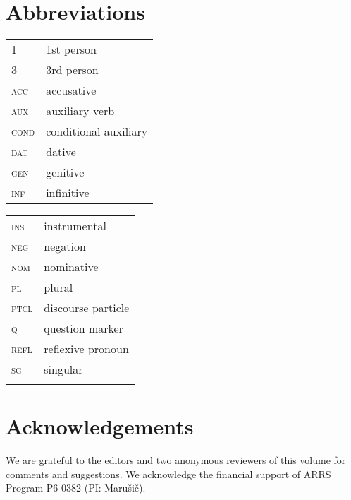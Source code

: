 \documentclass[output=paper,
modfonts,
newtxmath,
hidelinks
]{langscibook}
\begin{document}
\section*{Abbreviations}
\begin{tabularx}{.45\textwidth}{lQ}
\textsc{1}&1st person\\
\textsc{3}&3rd person\\
\textsc{acc}&accusative\\
\textsc{aux}&auxiliary verb\\
\textsc{cond}&conditional auxiliary\\
\textsc{dat}&dative\\
\textsc{gen}&genitive\\
\textsc{inf}&infinitive\\
\end{tabularx}
\begin{tabularx}{.45\textwidth}{lQ}
\textsc{ins}&instrumental\\
\textsc{neg}&negation\\
\textsc{nom}&nominative\\
\textsc{pl}&plural\\
\textsc{ptcl}&discourse particle\\
\textsc{q}&question marker\\
\textsc{refl}&reflexive pronoun\\
\textsc{sg}&singular\\
&\\
\end{tabularx}


\section*{Acknowledgements}
We are grateful to the editors and two anonymous reviewers of this volume for comments and suggestions. We acknowledge the financial support of ARRS Program P6-0382 (PI: Marušič).

\sloppy
\printbibliography[heading=subbibliography,notkeyword=this]
\end{document}
